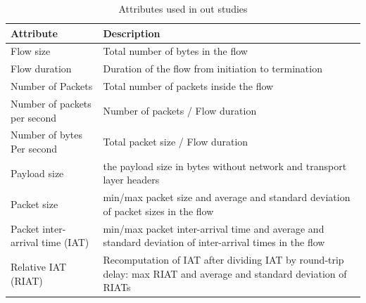 \documentclass[conference]{IEEEtran}
\begin{document}
\begin{table}
	\caption{Attributes used in out studies}
	\begin{tabular}{|l|l|}
		\hline Attribute & Description  \\
		\hline Flow size & Total number of bytes in the flow \\
		\hline Flow duration & Duration of the  flow from initiation to termination \\
		\hline Number of Packets & Total number of packets inside the flow  \\
		\hline Number of packets per second & Number of packets / Flow duration \\
		\hline Number of bytes Per second & Total packet size / Flow duration \\
		\hline Payload size & the payload size in bytes without network and transport layer headers \\
		\hline Packet size & min/max packet size and average and standard deviation of packet sizes in the flow  \\
		\hline Packet inter-arrival time (IAT) & min/max packet inter-arrival time and average and standard deviation of inter-arrival times in the flow  \\
		\hline Relative IAT (RIAT) & Recomputation of IAT after dividing IAT by round-trip delay:  max RIAT and average and standard deviation of RIATs \\
		\hline
	\end{tabular}
	\label{tab:attrs}
\end{table}
\end{document}
